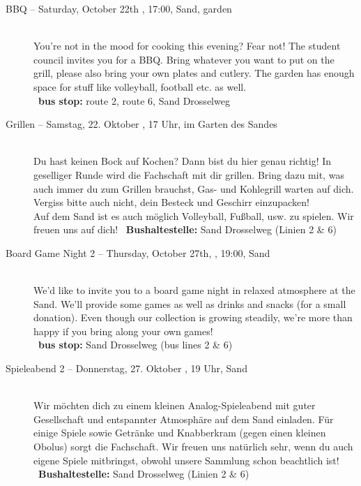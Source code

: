 \begin{description}
\ifml
	\item[BBQ -- Saturday, October 22th \YEAR, 17:00, Sand, garden]~\\
	You're not in the mood for cooking this evening? Fear not!
    The student council invites you for a BBQ. Bring whatever you want to put on the grill,
    please also bring your own plates and cutlery. The garden has enough space for stuff like volleyball, football etc. as well.\\
	~\textbf{bus stop:} route 2, route 6, Sand Drosselweg
\else
	\item[Grillen -- Samstag, 22. Oktober \YEAR, 17 Uhr, im Garten des Sandes]~\\
	Du hast keinen Bock auf Kochen? Dann bist du hier genau richtig! In geselliger Runde wird die Fachschaft mit dir grillen.
	Bring dazu mit, was auch immer du zum Grillen brauchst, Gas- und Kohlegrill warten auf dich. Vergiss bitte auch nicht, dein Besteck und Geschirr einzupacken!\\
	Auf dem Sand ist es auch möglich Volleyball, Fußball, usw. zu spielen. Wir freuen uns auf dich!
	~\textbf{Bushaltestelle:} Sand Drosselweg (Linien 2 \& 6)
\fi



\ifml
	\item[Board Game Night 2 -- Thursday, October 27th, \YEAR, 19:00, Sand]~\\
	We'd like to invite you to a board game night in relaxed atmosphere at the Sand.
	We'll provide some games as well as drinks and snacks (for a small donation).
	Even though our collection is growing steadily, we're more than happy if you bring along your own games!\\
	~\textbf{bus stop:} Sand Drosselweg (bus lines 2 \& 6)
\else
    \item[Spieleabend 2 -- Donnerstag, 27. Oktober \YEAR, 19 Uhr, Sand]~\\
	Wir möchten dich zu einem kleinen Analog-Spieleabend mit guter Gesellschaft und entspannter Atmosphäre auf dem Sand einladen.
	Für einige Spiele sowie Getränke und Knabberkram (gegen einen kleinen Obolus) sorgt die Fachschaft.
	Wir freuen uns natürlich sehr, wenn du auch eigene Spiele mitbringst, obwohl unsere Sammlung schon beachtlich ist!\\
	~\textbf{Bushaltestelle:} Sand Drosselweg (Linien 2 \& 6)
\fi


\end{description}

